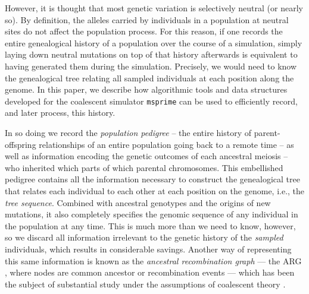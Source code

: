 \documentclass{article}
\newcommand{\msprime}{\texttt{msprime}}
\begin{document}
However, it is thought that most genetic variation is selectively neutral (or nearly so).
By definition, the alleles carried by individuals in a population at neutral sites
do not affect the population process.
For this reason, if one records the entire genealogical history of a population over the course of a simulation,
simply laying down neutral mutations on top of that history afterwards
is equivalent to having generated them during the simulation.
Precisely, we would need to know the genealogical tree relating all sampled individuals
at each position along the genome.
In this paper, we describe how algorithmic tools and data structures developed for the
coalescent simulator \msprime{}
can be used to efficiently record, and later process, this history.

In so doing we record the \emph{population pedigree} --
the entire history of parent-offspring relationships of an entire population going back to a remote time --
as well as information encoding the genetic outcomes of each ancestral meiosis --
who inherited which parts of which parental chromosomes.
This embellished pedigree contains all the information necessary
to construct the genealogical tree that relates each individual to each other
at each position on the genome, i.e., the \emph{tree sequence}.
Combined with ancestral genotypes and the origins of new mutations,
it also completely specifies the genomic sequence of any individual in the population at any time.
This is much more than we need to know, however,
so we discard all information irrelevant to the genetic history
of the \emph{sampled} individuals,
which results in considerable savings.
Another way of representing this same information
is known as the \emph{ancestral recombination graph} ---
the {ARG} \citep{griffiths1997ancestral},
where nodes are common ancestor or recombination events ---
which has been the subject of substantial study
under the assumptions of coalescent theory \citep{wiuf1997number,wiuf1999ancestry,marjoram2006coalescent,wilton2015smc}.
\end{document}
